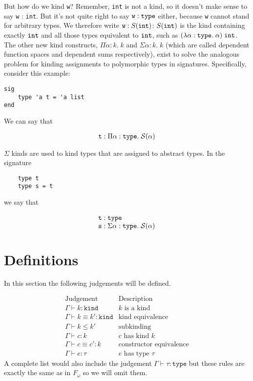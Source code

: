 \documentclass{article}
\newcommand{\type}{\ensuremath{\mathtt{type}}}
\newcommand{\kind}{\ensuremath{\mathtt{kind}}}
\begin{document}
But how do we kind \verb|w|? Remember, \verb|int| is not a kind, so it doesn't
make sense to say \verb|w| : \verb|int|. But it's not quite right to say
$\verb|w| : \type$ either, because \verb|w| cannot stand for arbitrary types. We
therefore write $\verb|w| : S(\verb|int|)$: $S(\verb|int|)$ is the kind
containing exactly $\verb|int|$ and all those types equivalent to $\verb|int|$,
such as $(\lambda \alpha : \type. \; \alpha) \; \verb|int|$. The other new kind
constructs, $\Pi \alpha : k. \; k$ and $\Sigma \alpha : k. \; k$ (which are
called dependent function spaces and dependent sums respectively), exist to
solve the analogous problem for kinding assignments to polymorphic types in
signatures. Specifically, consider this example:

\begin{verbatim}
sig
    type 'a t = 'a list
end
\end{verbatim}

We can say that

\[
  \begin{array}{l}
    \verb|t| : \Pi \alpha : \type. \; \mathcal S(\alpha)
  \end{array}
\]

\(\Sigma\) kinds are used to kind types that are assigned to abstract types. In
the signature

\begin{verbatim}
    type t
    type s = t
\end{verbatim}

we say that

\[
  \begin{array}{l}
    \verb|t| : \type \\
    \verb|s| : \Sigma \alpha : \type. \; \mathcal S(\alpha)
  \end{array}
\]


\section{Definitions}

In this section the following judgements will be defined.

\[
    \begin{array}{ll}
        \text{Judgement} & \text{Description} \\
        \hline
        \Gamma \vdash k : \kind & k \text{ is a kind} \\
        \Gamma \vdash k \equiv k' : \kind & \text{kind equivalence} \\
        \Gamma \vdash k \leq k' & \text{subkinding} \\
        \Gamma \vdash c : k & \text{$c$ has kind $k$} \\
        \Gamma \vdash c \equiv c' : k & \text{constructor equivalence} \\
        \Gamma \vdash e : \tau & \text{$e$ has type $\tau$}
    \end{array}
\]
A complete list would also include the judgement $\Gamma \vdash \tau : \type$
but these rules are exactly the same as in $F_\omega$ so we will omit them.
\end{document}
